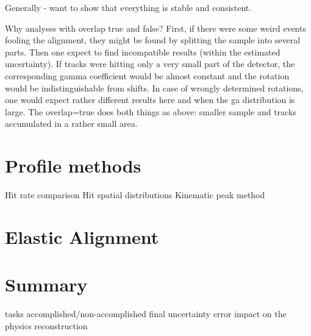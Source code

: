 
Generally - want to show that everything is stable and consistent.

Why analyses with overlap true and false?
\> First, if there were some weird events fooling the alignment, they might be found by splitting the sample into several parts. Then one expect to find incompatible results (within the estimated uncertainty).
\> If tracks were hitting only a very small part of the detector, the corresponding gamma coefficient would be almost constant and the rotation would be indistinguishable from shifts. In case of wrongly determined rotations, one would expect rather different results here and when the ga distribution is large.
\> The overlap=true does both things as above: smaller sample and tracks accumulated in a rather small area.


\section[al prof]{Profile methods}

\> Hit rate comparison
\> Hit spatial distributions
\> Kinematic peak method

\section[al elast]{Elastic Alignment}

\section[al sum]{Summary}

\> tasks accomplished/non-accomplished
\> final uncertainty
\> error impact on the physics reconstruction
